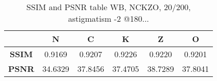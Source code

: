 
\begin{table}[h]
	\centering
	\label{table:metrics_astig-2@180_wb}
	\caption[???]{SSIM and PSNR table WB, NCKZO, 20/200, astigmatism -2 @180...}

	\begin{tabular}{cccccc}
	{\bf }                          & {\bf N} & {\bf C} & {\bf K} & {\bf Z} & {\bf O} \\ \hline
	\multicolumn{1}{c|}{{\bf SSIM}} & 0.9169  & 0.9207  & 0.9226  & 0.9220  & 0.9201  		\\
	\multicolumn{1}{c|}{{\bf PSNR}} & 34.6329 & 37.8456 & 37.4705 & 38.7289 & 37.8041
	\end{tabular}
\end{table}